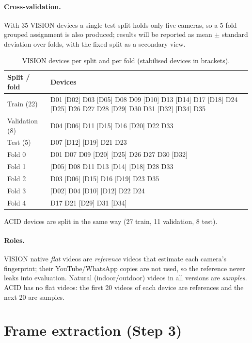 \documentclass[11pt,a4paper]{article}
\begin{document}
\paragraph{Cross-validation.} With 35 VISION devices a single test split holds only five cameras, so
a 5-fold grouped assignment is also produced; results will be reported as mean $\pm$ standard
deviation over folds, with the fixed split as a secondary view.

\begin{table}[H]
\centering\small
\caption{VISION devices per split and per fold (stabilised devices in brackets).}
\begin{tabularx}{\linewidth}{lY}
\toprule
Split / fold & Devices \\
\midrule
Train (22) & D01 [D02] D03 [D05] D08 D09 [D10] D13 [D14] D17 [D18] D24 [D25] D26 D27 D28 [D29] D30 D31 [D32] [D34] D35 \\
Validation (8) & D04 [D06] D11 [D15] D16 [D20] D22 D33 \\
Test (5) & D07 [D12] [D19] D21 D23 \\
\midrule
Fold 0 & D01 D07 D09 [D20] [D25] D26 D27 D30 [D32] \\
Fold 1 & [D05] D08 D11 D13 [D14] [D18] D28 D33 \\
Fold 2 & D03 [D06] [D15] D16 [D19] D23 D35 \\
Fold 3 & [D02] D04 [D10] [D12] D22 D24 \\
Fold 4 & D17 D21 [D29] D31 [D34] \\
\bottomrule
\end{tabularx}
\end{table}
ACID devices are split in the same way (27 train, 11 validation, 8 test).

\paragraph{Roles.} VISION native \emph{flat} videos are \emph{reference} videos that estimate each
camera's fingerprint; their YouTube/WhatsApp copies are not used, so the reference never leaks into
evaluation. Natural (indoor/outdoor) videos in all versions are \emph{samples}. ACID has no flat
videos: the first 20 videos of each device are references and the next 20 are samples.

\section{Frame extraction (Step 3)}
\end{document}
